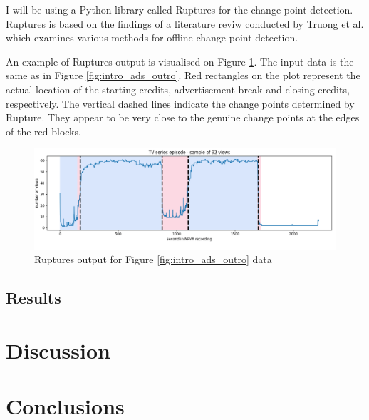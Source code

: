 I will be using a Python library called Ruptures for the change point detection. Ruptures is based on the findings of a literature reviw conducted by Truong et al. \cite{truongSelectiveReviewOffline2020} which examines various methods for offline change point detection.

An example of Ruptures output is visualised on Figure \ref{fig:ruptures_change_detection}. The input data is the same as in Figure \ref{fig:intro_ads_outro}. Red rectangles on the plot represent the actual location of the starting credits, advertisement break and closing credits, respectively. The vertical dashed lines indicate the change points determined by Rupture. They appear to be very close to the genuine change points at the edges of the red blocks.

\begin{figure}[H]
\centering
\includegraphics[width=1\textwidth]{../plots/episode-pen100.png}
\caption{Ruptures output for Figure \ref{fig:intro_ads_outro} data}
\label{fig:ruptures_change_detection}
\end{figure}

\subsection{Results} \label{sec:results}

\section{Discussion} \label{sec:discussion}

\section{Conclusions} \label{sec:conclusions}
